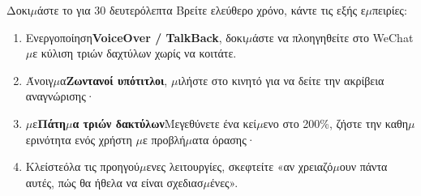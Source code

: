 \begin{tcbpractice}{Δοκι$\mu$άστε το για 30 δευτερόλεπτα}
Βρείτε ελεύθερο χρόνο, κάντε τις εξής ε$\mu$πειρίες:

\begin{enumerate}
  \item Ενεργοποίηση\textbf{VoiceOver / TalkBack}, δοκι$\mu$άστε να πλοηγηθείτε στο WeChat $\mu$ε κύλιση τριών δαχτύλων χωρίς να κοιτάτε.
  \item Άνοιγ$\mu$α\textbf{Ζωντανοί υπότιτλοι}, $\mu$ιλήστε στο κινητό για να δείτε την ακρίβεια αναγνώρισης·
  \item $\mu$ε\textbf{Πάτη$\mu$α τριών δακτύλων}Μεγεθύνετε ένα κεί$\mu$ενο στο 200\%, ζήστε την καθη$\mu$ερινότητα ενός χρήστη $\mu$ε προβλή$\mu$ατα όρασης·
  \item Κλείστεόλα τις προηγού$\mu$ενες λειτουργίες, σκεφτείτε «αν χρειαζό$\mu$ουν πάντα αυτές, πώς θα ήθελα να είναι σχεδιασ$\mu$ένες».
\end{enumerate}

\end{tcbpractice}
